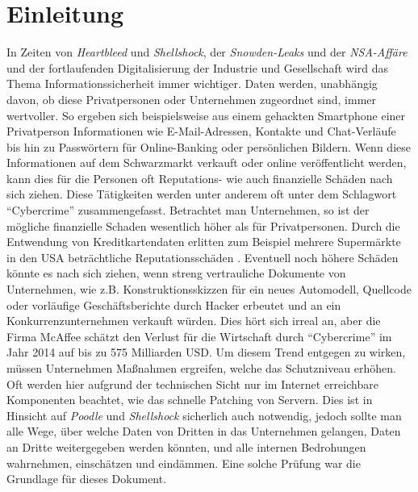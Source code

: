 \chapter{Einleitung}
In Zeiten von \textit{Heartbleed}\cite{Heartbleed} und  \textit{Shellshock}\cite{Shellshock}, der \textit{Snowden-Leaks} und der \textit{NSA-Affäre}\cite{Snowden} und der fortlaufenden Digitalisierung der Industrie und Gesellschaft wird das Thema Informationssicherheit immer wichtiger. Daten werden, unabhängig davon, ob diese Privatpersonen oder Unternehmen zugeordnet sind, immer wertvoller. So ergeben sich beispielsweise aus einem gehackten Smartphone einer Privatperson Informationen wie E-Mail-Adressen, Kontakte und Chat-Verläufe bis hin zu Passwörtern für Online-Banking oder persönlichen Bildern. Wenn diese Informationen auf dem Schwarzmarkt verkauft oder online veröffentlicht werden, kann dies für die Personen oft Reputations- wie auch finanzielle Schäden nach sich ziehen. Diese Tätigkeiten werden unter anderem oft unter dem Schlagwort "`Cybercrime"' zusammengefasst. Betrachtet man Unternehmen, so ist der mögliche finanzielle Schaden wesentlich höher als für Privatpersonen. Durch die Entwendung von Kreditkartendaten erlitten zum Beispiel mehrere Supermärkte in den USA beträchtliche Reputationsschäden \cite{HackKreditkarten}\cite{HackKreditkarten2}. Eventuell noch höhere Schäden könnte es nach sich ziehen, wenn streng vertrauliche Dokumente von Unternehmen, wie z.B. Konstruktionsskizzen für ein neues Automodell, Quellcode oder vorläufige Geschäftsberichte durch Hacker erbeutet und an ein Konkurrenzunternehmen verkauft würden. Dies hört sich irreal an, aber die Firma McAffee schätzt den Verlust für die Wirtschaft durch "`Cybercrime"' im Jahr 2014 auf bis zu 575 Milliarden USD\cite{McAffee}. 
Um diesem Trend entgegen zu wirken, müssen Unternehmen Maßnahmen ergreifen, welche das Schutzniveau erhöhen. Oft werden hier aufgrund der technischen Sicht nur im Internet erreichbare Komponenten beachtet, wie das schnelle Patching von Servern. Dies ist in Hinsicht auf  \textit{Poodle}\cite{Poodle} und \textit{Shellshock}\cite{Shellshock} sicherlich auch notwendig, jedoch sollte man alle Wege, über welche Daten von Dritten in das Unternehmen gelangen, Daten an Dritte weitergegeben werden könnten, und alle internen Bedrohungen wahrnehmen, einschätzen und eindämmen. Eine solche Prüfung war die Grundlage für dieses Dokument.